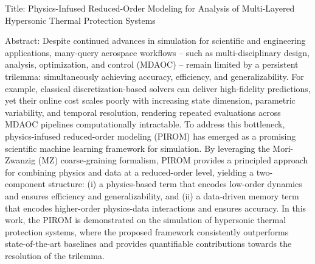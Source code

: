Title: Physics-Infused Reduced-Order Modeling for Analysis of Multi-Layered Hypersonic Thermal Protection Systems

Abstract: Despite continued advances in simulation for scientific and engineering applications, many-query aerospace workflows -- such as multi-disciplinary design, analysis, optimization, and control (MDAOC) -- remain limited by a persistent trilemma: simultaneously achieving accuracy, efficiency, and generalizability. For example, classical discretization-based solvers can deliver high-fidelity predictions, yet their online cost scales poorly with increasing state dimension, parametric variability, and temporal resolution, rendering repeated evaluations across MDAOC pipelines computationally intractable. To address this bottleneck, physics-infused reduced-order modeling (PIROM) has emerged as a promising scientific machine learning framework for simulation. By leveraging the Mori-Zwanzig (MZ) coarse-graining formalism, PIROM provides a principled approach for combining physics and data at a reduced-order level, yielding a two-component structure: (i) a physics-based term that encodes low-order dynamics and ensures efficiency and generalizability, and (ii) a data-driven memory term that encodes higher-order physics-data interactions and ensures accuracy. In this work, the PIROM is demonstrated on the simulation of hypersonic thermal protection systems, where the proposed framework consistently outperforms state-of-the-art baselines and provides quantifiable contributions towards the resolution of the trilemma.